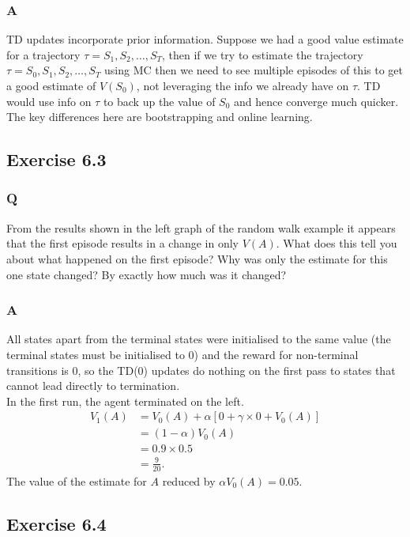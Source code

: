 \subsubsection*{A}
TD updates incorporate prior information. Suppose we had a good value estimate for a trajectory $\tau = S_1, S_2, \dots, S_T$, then if we try to estimate the trajectory $\tau = S_0, S_1, S_2, \dots, S_T$ using MC then we need to see multiple episodes of this to get a good estimate of $V(S_0)$, not leveraging the info we already have on $\tau$. TD would use info on $\tau$ to back up the value of $S_0$ and hence converge much quicker. The key differences here are bootstrapping and online learning.

\subsection{Exercise 6.3}
\subsubsection*{Q}
From the results shown in the left graph of the random walk example it appears that the first episode results in a change in only $V(A)$. What does this tell you about what happened on the first episode? Why was only the estimate for this one state changed? By exactly how much was it changed?

\subsubsection*{A}
All states apart from the terminal states were initialised to the same value (the terminal states must be initialised to 0) and the reward for non-terminal transitions is 0, so the TD(0) updates do nothing on the first pass to states that cannot lead directly to termination. \\

In the first run, the agent terminated on the left.
\begin{align}
    V_1(A) &= V_0(A) + \alpha[ 0 + \gamma \times 0 + V_0(A)]\\
           &= (1-\alpha) V_0(A) \\
           &= 0.9 \times 0.5 \\
           &= \frac{9}{20}.
\end{align}    
The value of the estimate for $A$ reduced by $\alpha V_0(A) = 0.05$.

\subsection{Exercise 6.4}
